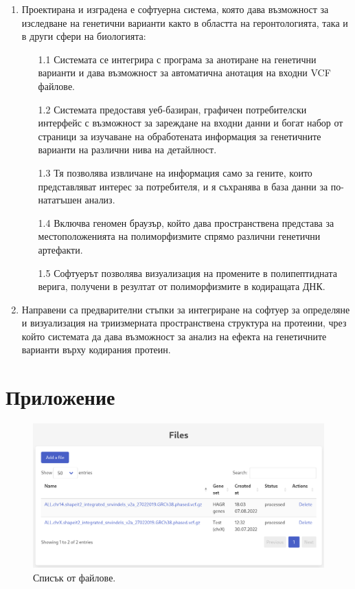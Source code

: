 \documentclass[pdftex,cyrillic,14pt,a4page,twoside,openright]{extreport}
\begin{document}
\begin{enumerate}
	\item Проектирана и изградена е софтуерна система, която дава възможност за изследване на генетични варианти както в областта на геронтологията, така и в други сфери на биологията:
	\begin{enumerate}
	    \item[1.1] Системата се интегрира с програма за анотиране на генетични варианти и дава възможност за автоматична анотация на входни VCF файлове.
		\item[1.2] Системата предоставя уеб-базиран, графичен потребителски интерфейс с възможност за зареждане на входни данни и богат набор от страници за изучаване на обработената информация за генетичните варианти на различни нива на детайлност.
		\item[1.3] Тя позволява извличане на информация само за гените, които представляват интерес за потребителя, и я съхранява в база данни за по-нататъшен анализ.
		\item[1.4] Включва геномен браузър, който дава пространствена представа за местоположенията на полиморфизмите спрямо различни генетични артефакти.
		\item[1.5] Софтуерът позволява визуализация на промените в полипептидната верига, получени в резултат от полиморфизмите в кодиращата ДНК.
	\end{enumerate}
	\item Направени са предварителни стъпки за интегриране на софтуер за определяне и визуализация на триизмерната пространствена структура на протеини, чрез който системата да дава възможност за анализ на ефекта на генетичните варианти върху кодирания протеин.
\end{enumerate}


\cleardoublepage
{}
{}




\cleardoublepage
\chapter*{Приложение}
{}

\begin{figure}[h]
  \centering
  \includegraphics[width=16cm]{figures/list_files}
  \caption {Списък от файлове.}
  \label{fig:list_files}
\end{figure}
\end{document}
